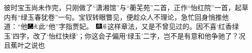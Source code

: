 彼时宝玉尚未作完，只刚做了``潇湘馆''与``蘅芜苑''二首，正作``怡红院''一首，起草内有``绿玉春犹卷''一句。宝钗转眼瞥见，便趁众人不理论，急忙回身悄推他道：``他{\includegraphics[width=3mm]{../Images/00003}\includegraphics[width=3mm]{../Images/00012}\footnotesize \kaishu 此``他''字指贾妃。　{\includegraphics[width=3mm]{../Images/00004}\includegraphics[width=3mm]{../Images/00010}\footnotesize \kaishu 这样章法，又是不曾见过的。}}因不喜`红香绿玉'四字，改了`怡红快绿'；你这会子偏用`绿玉'二字，岂不是有意和他争驰了？况且蕉叶之说也